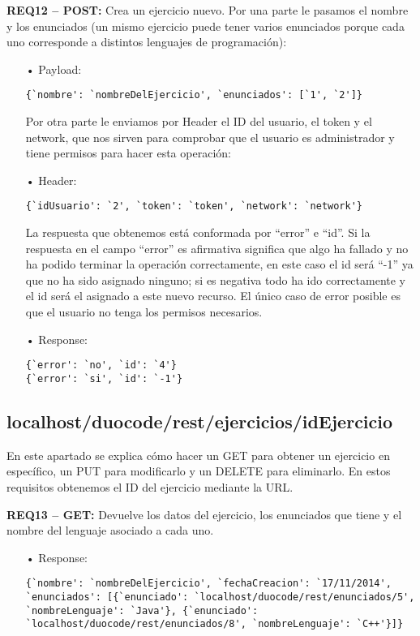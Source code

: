 \textbf{REQ12 – POST:} Crea un ejercicio nuevo. Por una parte le pasamos el nombre y los enunciados (un mismo ejercicio puede tener varios enunciados porque cada uno corresponde a distintos lenguajes de programación):
\begin{itemize}
\item[•]
Payload: 
{\codesize
\begin{verbatim}
{`nombre': `nombreDelEjercicio', `enunciados': [`1', `2']}
\end{verbatim}
}

Por otra parte le enviamos por Header el ID del usuario, el token y el network, que nos sirven para comprobar que el usuario es administrador y tiene permisos para hacer esta operación:
\item[•]
Header: 
{\codesize
\begin{verbatim}
{`idUsuario': `2', `token': `token', `network': `network'}
\end{verbatim}
}

La respuesta que obtenemos está conformada por ``error'' e ``id''. Si la respuesta en el campo ``error'' es afirmativa significa que algo ha fallado y no ha podido terminar la operación correctamente, en este caso el id será ``-1'' ya que no ha sido asignado ninguno; si es negativa todo ha ido correctamente y el id será el asignado a este nuevo recurso. El único caso de error posible es que el usuario no tenga los permisos necesarios.
\item[•]
Response: 
{\codesize
\begin{verbatim}
{`error': `no', `id': `4'}
{`error': `si', `id': `-1'}
\end{verbatim}
}
\end{itemize}

\subsection{localhost/duocode/rest/ejercicios/idEjercicio}
En este apartado se explica cómo hacer un GET para obtener un ejercicio en específico, un PUT para modificarlo y un DELETE para eliminarlo.
En estos requisitos obtenemos el ID del ejercicio mediante la URL.

\textbf{REQ13 – GET:} Devuelve los datos del ejercicio, los enunciados que tiene y el nombre del lenguaje asociado a cada uno.
\begin{itemize}
\item[•]
Response: 
{\codesize
\begin{verbatim}
{`nombre': `nombreDelEjercicio', `fechaCreacion': `17/11/2014', 
`enunciados': [{`enunciado': `localhost/duocode/rest/enunciados/5', 
`nombreLenguaje': `Java'}, {`enunciado': 
`localhost/duocode/rest/enunciados/8', `nombreLenguaje': `C++'}]}
\end{verbatim}
}
\end{itemize}

